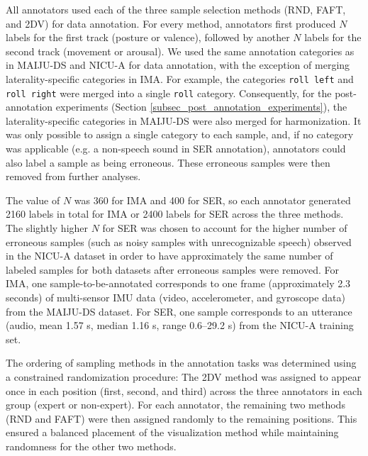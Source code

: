 \documentclass[a4paper,fleqn]{cas-dc}
\begin{document}
All annotators used each of the three sample selection methods (RND, FAFT, and 2DV) for data annotation. For every method, annotators first produced $N$ labels for the first track (posture or valence), followed by another $N$ labels for the second track (movement or arousal). We used the same annotation categories as in MAIJU-DS and NICU-A for data annotation, with the exception of merging laterality-specific categories in IMA. For example, the categories \texttt{roll left} and \texttt{roll right} were merged into a single \texttt{roll} category. Consequently, for the post-annotation experiments (Section \ref{subsec_post_annotation_experiments}), the laterality-specific categories in MAIJU-DS were also merged for harmonization. It was only possible to assign a single category to each sample, and, if no category was applicable (e.g. a non-speech sound in SER annotation), annotators could also label a sample as being erroneous. These erroneous samples were then removed from further analyses.

The value of $N$ was 360 for IMA and 400 for SER, so each annotator generated 2160 labels in total for IMA or 2400 labels for SER across the three methods. The slightly higher $N$ for SER was chosen to account for the higher number of erroneous samples (such as noisy samples with unrecognizable speech) observed in the NICU-A dataset in order to have approximately the same number of labeled samples for both datasets after erroneous samples were removed. For IMA, one sample-to-be-annotated corresponds to one frame (approximately 2.3 seconds) of multi-sensor IMU data (video, accelerometer, and gyroscope data) from the MAIJU-DS dataset. For SER, one sample corresponds to an utterance (audio, mean 1.57 s, median 1.16 s, range 0.6--29.2 s) from the NICU-A training set.

The ordering of sampling methods in the annotation tasks was determined using a constrained randomization procedure: The 2DV method was assigned to appear once in each position (first, second, and third) across the three annotators in each group (expert or non-expert). For each annotator, the remaining two methods (RND and FAFT) were then assigned randomly to the remaining positions. This ensured a balanced placement of the visualization method while maintaining randomness for the other two methods.
\end{document}
